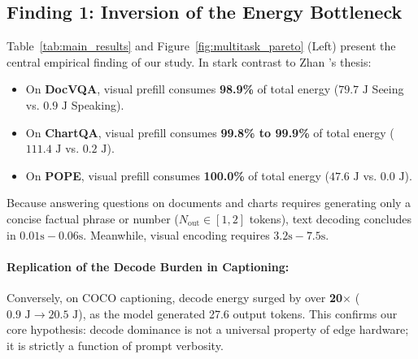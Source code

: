 \subsection{Finding 1: Inversion of the Energy Bottleneck}
Table~\ref{tab:main_results} and Figure~\ref{fig:multitask_pareto} (Left) present the central empirical finding of our study. In stark contrast to Zhan \etal's thesis:
\begin{itemize}[leftmargin=*]
    \item On \textbf{DocVQA}, visual prefill consumes \textbf{98.9\%} of total energy ($79.7\text{ J}$ Seeing vs. $0.9\text{ J}$ Speaking).
    \item On \textbf{ChartQA}, visual prefill consumes \textbf{99.8\% to 99.9\%} of total energy ($111.4\text{ J}$ vs. $0.2\text{ J}$).
    \item On \textbf{POPE}, visual prefill consumes \textbf{100.0\%} of total energy ($47.6\text{ J}$ vs. $0.0\text{ J}$).
\end{itemize}
Because answering questions on documents and charts requires generating only a concise factual phrase or number ($N_{\text{out}} \in [1, 2]$ tokens), text decoding concludes in $0.01\text{s} - 0.06\text{s}$. Meanwhile, visual encoding requires $3.2\text{s} - 7.5\text{s}$. 

\paragraph{Replication of the Decode Burden in Captioning:}
Conversely, on COCO captioning, decode energy surged by over \textbf{20$\times$} ($0.9\text{ J} \to 20.5\text{ J}$), as the model generated 27.6 output tokens. This confirms our core hypothesis: decode dominance is not a universal property of edge hardware; it is strictly a function of prompt verbosity.

